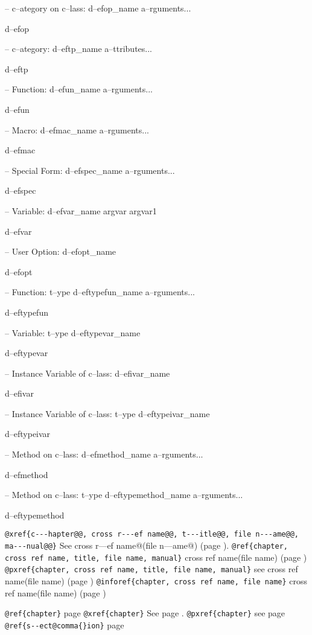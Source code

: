 \documentclass{book}
\begin{document}
\hbox{}-- c--ategory on c--lass: d--efop\_name a--rguments...


d--efop


\hbox{}-- c--ategory: d--eftp\_name a--ttributes...


d--eftp


\hbox{}-- Function: d--efun\_name a--rguments...


d--efun


\hbox{}-- Macro: d--efmac\_name a--rguments...


d--efmac


\hbox{}-- Special Form: d--efspec\_name a--rguments...


d--efspec


\hbox{}-- Variable: d--efvar\_name argvar argvar1


d--efvar


\hbox{}-- User Option: d--efopt\_name


d--efopt


\hbox{}-- Function: t--ype d--eftypefun\_name a--rguments...


d--eftypefun


\hbox{}-- Variable: t--ype d--eftypevar\_name


d--eftypevar


\hbox{}-- Instance Variable of c--lass: d--efivar\_name


d--efivar


\hbox{}-- Instance Variable of c--lass: t--ype d--eftypeivar\_name


d--eftypeivar


\hbox{}-- Method on c--lass: d--efmethod\_name a--rguments...


d--efmethod


\hbox{}-- Method on c--lass: t--ype d--eftypemethod\_name a--rguments...


d--eftypemethod


\texttt{@xref\{c{-}{-}{-}hapter@@, cross r{-}{-}{-}ef name@@, t{-}{-}{-}itle@@, file n{-}{-}{-}ame@@, ma{-}{-}{-}nual@@\}} See cross r---ef name@(file n---ame@) (page \pageref{anchor:c_002d_002d_002dhapter_0040}).
\texttt{@ref\{chapter, cross ref name, title, file name, manual\}} cross ref name(file name) (page \pageref{anchor:chapter})
\texttt{@pxref\{chapter, cross ref name, title, file name, manual\}} see cross ref name(file name) (page \pageref{anchor:chapter})
\texttt{@inforef\{chapter, cross ref name, file name\}} cross ref name(file name) (page \pageref{anchor:chapter})


\texttt{@ref\{chapter\}} page \pageref{anchor:chapter}
\texttt{@xref\{chapter\}} See page \pageref{anchor:chapter}.
\texttt{@pxref\{chapter\}} see page \pageref{anchor:chapter}
\texttt{@ref\{s{-}{-}ect@comma\{\}ion\}} page \pageref{anchor:s_002d_002dect_002cion}
\end{document}
